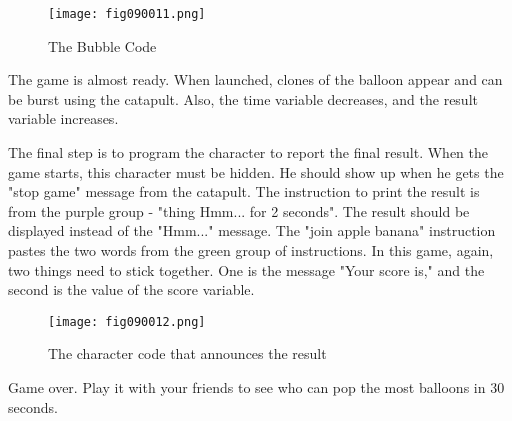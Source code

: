 \begin{figure}[H]
   \centering
   \texttt{[image: fig090011.png]}
   \caption{The Bubble Code}
\label{fig090011}
\end{figure}

The game is almost ready. When launched, clones of the balloon appear and can be burst using the catapult. Also, the time variable decreases, and the result variable increases.

The final step is to program the character to report the final result. When the game starts, this character must be hidden. He should show up when he gets the "stop game" message from the catapult. The instruction to print the result is from the purple group - "thing Hmm... for 2 seconds". The result should be displayed instead of the "Hmm..." message. The "join apple banana" instruction pastes the two words from the green group of instructions. In this game, again, two things need to stick together. One is the message "Your score is," and the second is the value of the score variable.

\begin{figure}[H]
   \centering
   \texttt{[image: fig090012.png]}
   \caption{The character code that announces the result}
\label{fig090012}
\end{figure}

Game over. Play it with your friends to see who can pop the most balloons in 30 seconds.
